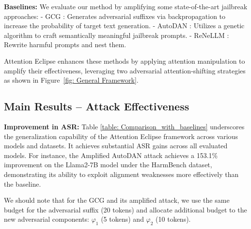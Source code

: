 \noindent \textbf{Baselines:} We evaluate our method by amplifying some state-of-the-art jailbreak approaches:  
- GCG \citep{zou2023universal}: Generates adversarial suffixes via backpropagation to increase the probability of target text generation. 
- AutoDAN \citep{liu2023autodan}: Utilizes a genetic algorithm to craft semantically meaningful jailbreak prompts.  
- ReNeLLM \citep{ding2023wolf}: Rewrite harmful prompts and nest them.

Attention Eclipse enhances these methods by applying attention manipulation to amplify their effectiveness, leveraging two adversarial attention-shifting strategies as shown in Figure~\ref{fig: General Framework}.



\subsection{Main Results -- Attack Effectiveness}
\label{sec: Main Results}

\noindent \textbf{Improvement in ASR:} Table \ref{table: Comparison_with_baselines} underscores the generalization capability of the Attention Eclipse framework across various models and datasets. It achieves substantial ASR gains across all evaluated models. For instance, the Amplified AutoDAN attack achieves a 153.1\% improvement on the Llama2-7B model under the HarmBench dataset, demonstrating its ability to exploit alignment weaknesses more effectively than the baseline. 

We should note that for the GCG and its amplified attack, we use the same budget for the adversarial suffix (20 tokens) and allocate additional budget to the new adversarial components: $\varphi_1$ (5 tokens) and $\varphi_2$ (10 tokens). \\






